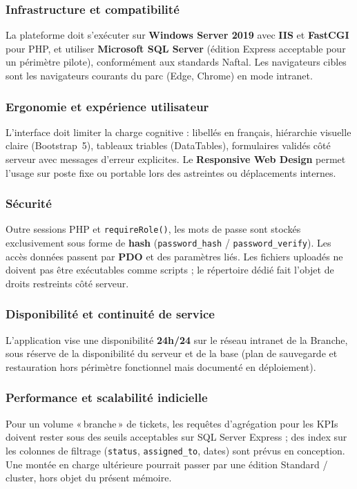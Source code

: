 \subsubsection{Infrastructure et compatibilité}
La plateforme doit s'exécuter sur \textbf{Windows Server 2019} avec \textbf{IIS} et
\textbf{FastCGI} pour PHP, et utiliser \textbf{Microsoft SQL Server} (édition Express acceptable
pour un périmètre pilote), conformément aux standards Naftal. Les navigateurs cibles sont les
navigateurs courants du parc (Edge, Chrome) en mode intranet.

\subsubsection{Ergonomie et expérience utilisateur}
L'interface doit limiter la charge cognitive : libellés en français, hiérarchie visuelle claire
(Bootstrap~5), tableaux triables (DataTables), formulaires validés côté serveur avec messages
d'erreur explicites. Le \textbf{Responsive Web Design} permet l'usage sur poste fixe ou portable
lors des astreintes ou déplacements internes.

\subsubsection{Sécurité}
Outre sessions PHP et \texttt{requireRole()}, les mots de passe sont stockés exclusivement sous
forme de \textbf{hash} (\texttt{password\_hash} / \texttt{password\_verify}). Les accès données
passent par \textbf{PDO} et des paramètres liés. Les fichiers uploadés ne doivent pas être
exécutables comme scripts ; le répertoire dédié fait l'objet de droits restreints côté serveur.

\subsubsection{Disponibilité et continuité de service}
L'application vise une disponibilité \textbf{24h/24} sur le réseau intranet de la Branche, sous
réserve de la disponibilité du serveur et de la base (plan de sauvegarde et restauration hors
périmètre fonctionnel mais documenté en déploiement).

\subsubsection{Performance et scalabilité indicielle}
Pour un volume «\,branche\,» de tickets, les requêtes d'agrégation pour les KPIs doivent rester
sous des seuils acceptables sur SQL Server Express ; des index sur les colonnes de filtrage
(\texttt{status}, \texttt{assigned\_to}, dates) sont prévus en conception. Une montée en charge
ultérieure pourrait passer par une édition Standard / cluster, hors objet du présent mémoire.

